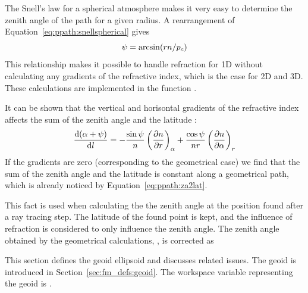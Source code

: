 The Snell's law for a spherical atmosphere makes it very easy to
determine the zenith angle of the path for a given radius. A
rearrangement of Equation~\ref{eq:ppath:snellspherical} gives
\begin{equation}
  \psi = \arcsin( r n / p_c )
 \label{eq:ppath:za1D}
\end{equation}
This relationship makes it possible to handle refraction for 1D
without calculating any gradients of the refractive index, which is
the case for 2D and 3D. These calculations are implemented in
the function .


\label{sec:ppath:refr2D}
It can be shown that the vertical and horisontal gradients of the
refractive index affects the sum of the zenith angle and the latitude
\citet[Eq. 9.30]{rodgers:00}:
\begin{equation}
  \frac{\mathrm{d}(\alpha+\psi)}{\mathrm{d} l} = 
    -\frac{\sin\psi}{n} \left( \frac{\partial n}{\partial r} \right)_{\alpha}
    +\frac{\cos\psi}{nr} \left( \frac{\partial n}{\partial \alpha} \right)_{r}
  \label{eq:ppath:refrbend2d}
\end{equation}
If the gradients are zero (corresponding to the geometrical case) we
find that the sum of the zenith angle and the latitude is constant
along a geometrical path, which is already noticed by
Equation~\ref{eq:ppath:za2lat}.

This fact is used when calculating the the zenith angle at the
position found after a ray tracing step. The latitude of the found
point is kept, and the influence of refraction is considered to only
influence the zenith angle. The zenith angle obtained by the
geometrical calculations, , is corrected as  



\label{sec:ppath:refr3D}





\label{sec:ppath:geoids}

This section defines the geoid ellipsoid and discusses related
issues. The geoid is introduced in Section~\ref{sec:fm_defs:geoid}.
The workspace variable representing the geoid is .


\label{sec:ppath:geoid}

